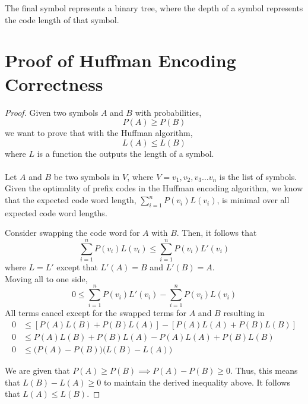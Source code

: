 \documentclass{article}
\begin{document}
The final symbol represents a binary tree, where the depth of a symbol represents the code length of that symbol.

\newpage

\section{Proof of Huffman Encoding Correctness}
\begin{proof}
Given two symbols $A$ and $B$ with probabilities,
$$
P(A) \geq P(B)
$$ 
we want to prove that with the Huffman algorithm,
$$
L(A) \leq L(B)
$$
where $L$ is a function the outputs the length of a symbol.
\\
\\
Let $A$ and $B$ be two symbols in $V$, where $V = {v_1, v_2, v_3 \ldots v_n}$ is the list of symbols.
\\
Given the optimality of prefix codes in the Huffman encoding algorithm, we know that the expected code word length, $\sum_{i=1}^n P(v_i)L(v_i)$, is minimal over all expected code word lengths.

Consider swapping the code word for $A$ with $B$. Then, it follows that
$$\sum_{i=1}^n P(v_i)L(v_i)  \le \sum_{i=1}^n P(v_i)L'(v_i)$$
where $L = L'$ except that $L'(A) = B$ and $L'(B) = A$.
\\
Moving all to one side,
$$0 \le \sum_{i=1}^n P(v_i)L'(v_i) - \sum_{i=1}^n P(v_i)L(v_i)$$
All terms cancel except for the swapped terms for $A$ and $B$ resulting in
\begin{align*}
	0 &\le \left[P(A)L(B) + P(B)L(A)\right] - \left[P(A)L(A) + P(B)L(B)\right] \\
	0 &\le P(A)L(B) + P(B)L(A) - P(A)L(A) + P(B)L(B)\\
	0 &\le \Big(P(A) - P(B)\Big)\Big(L(B) - L(A)\Big)
\end{align*}

We are given that $P(A) \ge P(B) \implies P(A)-P(B) \ge 0$. Thus, this means that $L(B)-L(A) \ge 0$ to maintain the derived inequality above. It follows that $L(A) \le L(B)$.

\end{proof}
\end{document}
